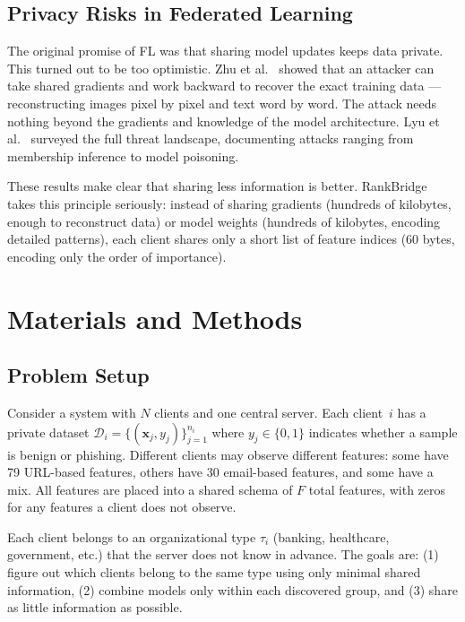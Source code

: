 \documentclass[12pt,a4paper]{article}
\begin{document}
\subsection{Privacy Risks in Federated Learning}

The original promise of FL was that sharing model updates keeps data private. This turned out to be too optimistic. Zhu et al.~\cite{zhu2019deepleakage} showed that an attacker can take shared gradients and work backward to recover the exact training data --- reconstructing images pixel by pixel and text word by word. The attack needs nothing beyond the gradients and knowledge of the model architecture. Lyu et al.~\cite{lyu2020threats} surveyed the full threat landscape, documenting attacks ranging from membership inference to model poisoning.

These results make clear that sharing less information is better. RankBridge takes this principle seriously: instead of sharing gradients (hundreds of kilobytes, enough to reconstruct data) or model weights (hundreds of kilobytes, encoding detailed patterns), each client shares only a short list of feature indices (60 bytes, encoding only the order of importance).

\section{Materials and Methods}\label{sec:methods}

\subsection{Problem Setup}

Consider a system with $N$ clients and one central server. Each client~$i$ has a private dataset $\mathcal{D}_i = \{(\mathbf{x}_j, y_j)\}_{j=1}^{n_i}$ where $y_j \in \{0,1\}$ indicates whether a sample is benign or phishing. Different clients may observe different features: some have 79 URL-based features, others have 30 email-based features, and some have a mix. All features are placed into a shared schema of $F$ total features, with zeros for any features a client does not observe.

Each client belongs to an organizational type $\tau_i$ (banking, healthcare, government, etc.) that the server does not know in advance. The goals are: (1) figure out which clients belong to the same type using only minimal shared information, (2) combine models only within each discovered group, and (3) share as little information as possible.
\end{document}
